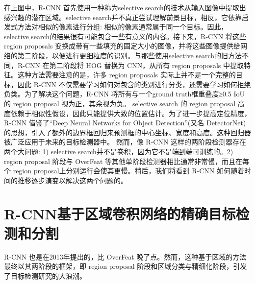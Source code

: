 \documentclass{article}
\begin{document}
	   	在上图中，R-CNN 首先使用一种称为selective search的技术从输入图像中提取出感兴趣的潜在区域。selective search并不真正尝试理解前景目标，相反，它依靠启发式方法对相似的像素进行分组: 相似的像素通常属于同一个目标。因此，selective search的结果很有可能包含一些有意义的内容。接下来，R-CNN 将这些 region proposals 变换成带有一些填充的固定大小的图像，并将这些图像提供给网络的第二阶段，以便进行更细粒度的识别。与那些使用selective search的旧方法不同，R-CNN 在第二阶段将 HOG 替换为 CNN，从所有 region proposals 中提取特征。这种方法需要注意的是，许多 region proposals 实际上并不是一个完整的目标，因此 R-CNN 不仅需要学习如何对包含的类别进行分类，还需要学习如何拒绝负类。为了解决这个问题，R-CNN 将所有与一个ground truth框重叠度≥0.5 IoU 的 region proposal 视为正，其余视为负。
	   	selective search 的 region proposal 高度依赖于相似性假设，因此只能提供大致的位置估计。为了进一步提高定位精度，R-CNN 借鉴了“Deep Neural Networks for Object Detection”(又名 DetectorNet)的思想，引入了额外的边界框回归来预测框的中心坐标、宽度和高度。这种回归器被广泛应用于未来的目标检测器中。
	   	然而，像 R-CNN 这样的两阶段检测器存在两个大问题: 1) selective search并不是卷积，因为它不是端到端可训练的。2) region proposal 阶段与 OverFeat 等其他单阶段检测器相比通常非常慢，而且在每个 region proposal上分别运行会使其更慢。稍后，我们将看到 R-CNN 如何随着时间的推移逐步演变以解决这两个问题的。
	   	
	   	\section{R-CNN基于区域卷积网络的精确目标检测和分割}
	   R-CNN 也是在2013年提出的，比 OverFeat 晚了点。然而，这种基于区域的方法最终以其两阶段的框架，即 region proposal 阶段和区域分类与精细化阶段，引发了目标检测研究的大浪潮。
	   
\end{document}
